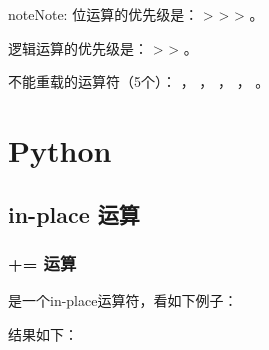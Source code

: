 \documentclass[letterpaper,10pt,english]{sphinxmanual}
\begin{document}
\begin{sphinxadmonition}{note}{Note:}
位运算的优先级是：\sphinxcode{\sphinxupquote{\textasciitilde{}}} \textgreater{} \sphinxcode{\sphinxupquote{\&}} \textgreater{} \sphinxcode{\sphinxupquote{\textasciicircum{}}} \textgreater{} \sphinxcode{\sphinxupquote{\textbar{}}} 。

逻辑运算的优先级是：\sphinxcode{\sphinxupquote{!}} \textgreater{} \sphinxcode{\sphinxupquote{\&\&}} \textgreater{} \sphinxcode{\sphinxupquote{\textbar{}\textbar{}}} 。

不能重载的运算符（5个）： ，  ， \sphinxcode{\sphinxupquote{::}} ， ， 。
\end{sphinxadmonition}


\chapter{Python}
\label{\detokenize{python/index:python}}\label{\detokenize{python/index::doc}}

\section{in-place 运算}
\label{\detokenize{python/01_inplace:in-place}}\label{\detokenize{python/01_inplace::doc}}

\subsection{+= 运算}
\label{\detokenize{python/01_inplace:id1}}
\sphinxcode{\sphinxupquote{+=}} 是一个in-place运算符，看如下例子：

%
\begin{sphinxVerbatim}[commandchars=\\\{\},numbers=left,firstnumber=1,stepnumber=1]
  \PYG{p}{[}\PYG{p}{]}
  
  \PYG{p}{[}\PYG{p}{]}
\end{sphinxVerbatim}

结果如下：

%
\begin{sphinxVerbatim}[commandchars=\\\{\}]
 
 
\end{sphinxVerbatim}
\end{document}
